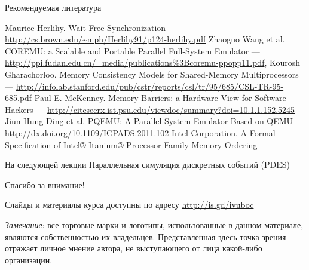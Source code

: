 \documentclass{beamer}
\begin{document}
\begin{frame}[allowframebreaks]{Рекомендуемая литература}
\begin{thebibliography}{99}
     Maurice Herlihy. Wait-Free Synchronization — \url{http://cs.brown.edu/~mph/Herlihy91/p124-herlihy.pdf}
     Zhaoguo Wang et al. COREMU: a Scalable and Portable Parallel Full-System Emulator — \url{http://ppi.fudan.edu.cn/_media/publications\%3Bcoremu-ppopp11.pdf},
     Kourosh Gharachorloo. Memory Consistency Models for Shared-Memory Multiprocessors — \url{http://infolab.stanford.edu/pub/cstr/reports/csl/tr/95/685/CSL-TR-95-685.pdf}
     Paul E. McKenney. Memory Barriers: a Hardware View for Software Hackers — \url{http://citeseerx.ist.psu.edu/viewdoc/summary?doi=10.1.1.152.5245}
     Jiun-Hung Ding et al. PQEMU: A Parallel System Emulator Based on QEMU — \url{http://dx.doi.org/10.1109/ICPADS.2011.102}
     Intel Corporation. A Formal Specification of {Intel}® {Itanium}® Processor Family Memory Ordering
\end{thebibliography}
\end{frame}

\begin{frame}{На следующей лекции}
\centering
Параллельная симуляция дискретных событий (PDES)
\end{frame}

\begin{frame}

{\huge{Спасибо за внимание!}\par}

\vfill

Слайды и материалы курса доступны по адресу \url{http://is.gd/ivuboc} %

\vfill

\tiny{\textit{Замечание}: все торговые марки и логотипы, использованные в данном материале, являются собственностью их владельцев. Представленная здесь точка зрения отражает личное мнение автора, не выступающего от лица какой-либо организации.}

\end{frame}
\end{document}
